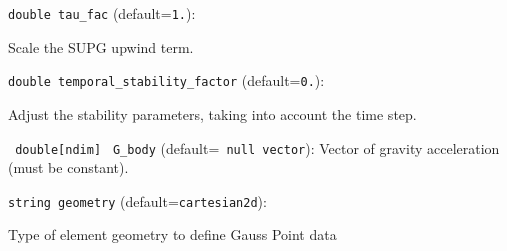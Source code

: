 \item\verb+double tau_fac+ {\rm(default=\verb|1.|)}:

Scale the SUPG upwind term. 

\item\verb+double temporal_stability_factor+ {\rm(default=\verb|0.|)}:

Adjust the stability parameters, taking into account
the time step. 

\item\verb+ double[ndim]+ \verb+ G_body+ {\rm(default=\verb| null vector|)}:
 Vector of gravity acceleration (must be constant). %
\item\verb+string geometry+ {\rm(default=\verb|cartesian2d|)}:

Type of element geometry to define Gauss Point data

